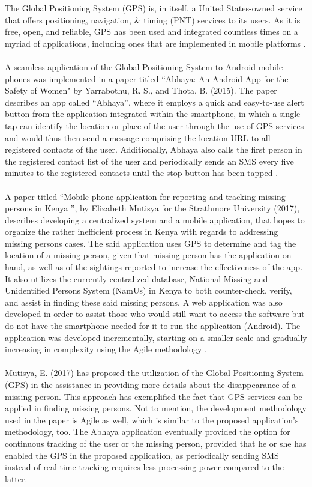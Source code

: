 The Global Positioning System (GPS) is, in itself, a United States-owned service that offers positioning, navigation, & timing (PNT) services to its users. As it is free, open, and reliable, GPS has been used and integrated countless times on a myriad of applications, including ones that are implemented in mobile platforms \cite{gpsGov}.
\\\\A seamless application of the Global Positioning System to Android mobile phones was implemented in a paper titled “Abhaya: An Android App for the Safety of Women" by Yarrabothu, R. S., and Thota, B. (2015). The paper describes an app called “Abhaya”, where it employs a quick and easy-to-use alert button from the application integrated within the smartphone, in which a single tap can identify the location or place of the user through the use of GPS services and would thus then send a message comprising the location URL to all registered contacts of the user. Additionally, Abhaya also calls the first person in the registered contact list of the user and periodically sends an SMS every five minutes to the registered contacts until the stop button has been tapped \cite{yarrabothu2015abhaya}.
\\\\A paper titled “Mobile phone application for reporting and tracking missing persons in Kenya ”, by Elizabeth Mutisya for the Strathmore University (2017), describes developing a centralized system and a mobile application, that hopes to organize the rather inefficient process in Kenya with regards to addressing missing persons cases. The said application uses GPS to determine and tag the location of a missing person, given that missing person has the application on hand, as well as of the sightings reported to increase the effectiveness of the app. It also utilizes the currently centralized database, National Missing and Unidentified Persons System (NamUs) in Kenya to both counter-check, verify, and assist in finding these said missing persons. A web application was also developed in order to assist those who would still want to access the software but do not have the smartphone needed for it to run the application (Android). The application was developed incrementally, starting on a smaller scale and gradually increasing in complexity using the Agile methodology \cite{mutisya2017mobile}.
\\\\Mutisya, E. (2017) has proposed the utilization of the Global Positioning System (GPS) in the assistance in providing more details about the disappearance of a missing person. This approach has exemplified the fact that GPS services can be applied in finding missing persons. Not to mention, the development methodology used in the paper is Agile as well, which is similar to the proposed application’s methodology, too. The Abhaya application \cite{yarrabothu2015abhaya} eventually provided the option for continuous tracking of the user or the missing person, provided that he or she has enabled the GPS in the proposed application, as periodically sending SMS instead of real-time tracking requires less processing power compared to the latter.
